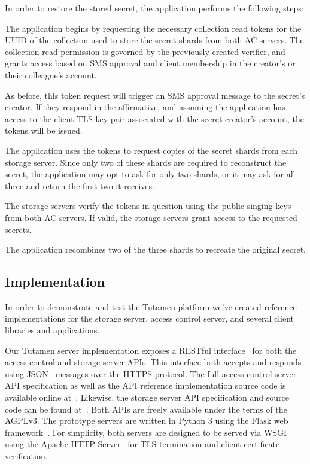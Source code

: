 In order to restore the stored secret, the application performs the
following steps:

\begin{packed_enum}
\item The application begins by requesting the necessary collection
  read tokens for the UUID of the collection used to store the secret
  shards from both AC servers. The collection read permission is
  governed by the previously created verifier, and grants access based
  on SMS approval and client membership in the creator's or their
  colleague's account.
\item As before, this token request will trigger an SMS approval
  message to the secret's creator. If they respond in the affirmative,
  and assuming the application has access to the client TLS key-pair
  associated with the secret creator's account, the tokens will be
  issued.
\item The application uses the tokens to request copies of the secret
  shards from each storage server. Since only two of these shards are
  required to reconstruct the secret, the application may opt to ask
  for only two shards, or it may ask for all three and return the
  first two it receives.
\item The storage servers verify the tokens in question using the
  public singing keys from both AC servers. If valid, the storage
  servers grant access to the requested secrets.
\item The application recombines two of the three shards to recreate
  the original secret.
\end{packed_enum}

\subsection{Implementation}

In order to demonstrate and test the Tutamen platform we've created
reference implementations for the storage server, access control
server, and several client libraries and applications.

Our Tutamen server implementation exposes a RESTful
interface~\cite{fielding2000} for both the access control and storage
server APIs. This interface both accepts and responds using
JSON~\cite{json} messages over the HTTPS protocol. The full access
control server API specification as well as the API reference
implementation source code is available online
at~\cite{src-tutamen-apiaccesscontrol}. Likewise, the storage server
API specification and source code can be found
at~\cite{src-tutamen-apistorage}. Both APIs are freely available under
the terms of the AGPLv3. The prototype servers are written in Python 3 using
the Flask web framework~\cite{python-flask}. For
simplicity, both servers are designed
to be served via WSGI~\cite{pep3333} using the Apache HTTP
Server~\cite{apache} for TLS termination and client-certificate
verification.

